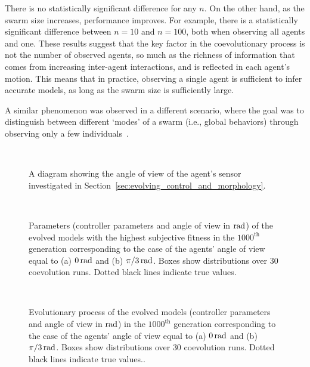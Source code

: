 There is no statistically significant difference for any $n$. On the other hand, as the swarm size increases, performance improves. For example, there is a statistically significant difference between $n=10$ and $n=100$, both when observing all agents and one. These results suggest that the key factor in the coevolutionary process is not the number of observed agents, so much as the richness of information that comes from increasing inter-agent interactions, and is reflected in each agent's motion. This means that in practice, observing a single agent is sufficient to infer accurate models, as long as the swarm size is sufficiently large.

A similar phenomenon was observed in a different scenario, where the goal was to distinguish between different `modes' of a swarm (i.e., global behaviors) through observing only a few individuals~\cite{Daniel2014}.

\begin{figure}[!t]%
	\centering
		\subfloat[(a) \label{fig:Angle_I=0}]{%
			\texttt{[image: Angle\_I=0.pdf]}
		}\\
		\subfloat[(b) \label{fig:Angle_I=1}]{%
			\texttt{[image: Angle\_I=1.pdf]}
		}
		\caption{A diagram showing the angle of view of the agent's sensor investigated in Section~\ref{sec:evolving_control_and_morphology}.}
		\label{fig:Angle_I}
\end{figure}

\begin{figure}[!t]%
	\centering
		\\
		\caption{Parameters (controller parameters and angle of view in $\unit[]{rad}$) of the evolved models with the highest subjective fitness in the $1000^\textrm{th}$ generation corresponding to the case of the agents' angle of view equal to (a) $\unit[0]{rad}$ and (b) $\unit[\pi/3]{rad}$. Boxes show distributions over $30$ coevolution runs. Dotted black lines indicate true values.}
		\label{fig:model_parameters_box_aggregation_angle}
\end{figure}

\begin{figure}[!t]%
	\centering
		\\
		\caption{Evolutionary process of the evolved models (controller parameters and angle of view in $\unit[]{rad}$) in the $1000^\textrm{th}$ generation corresponding to the case of the agents' angle of view equal to (a) $\unit[0]{rad}$ and (b) $\unit[\pi/3]{rad}$. Boxes show distributions over $30$ coevolution runs. Dotted black lines indicate true values.. \label{fig:model_parameters_convergence_angleview}}
\end{figure}
%
